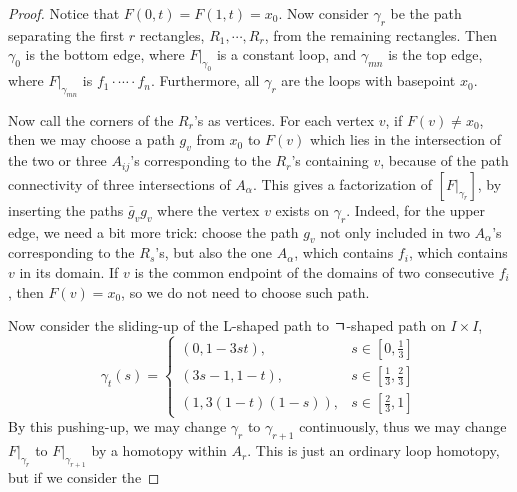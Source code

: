 \begin{proof}
Notice that $F(0,t)=F(1,t)=x_0$. Now consider $\gamma_r$ be the path separating the first $r$ rectangles, $R_1,\cdots,R_r$, from the remaining rectangles. Then $\gamma_0$ is the bottom edge, where $F|_{\gamma_0}$ is a constant loop, and $\gamma_{mn}$ is the top edge, where $F|_{\gamma_{mn}}$ is $f_1\cdot\cdots\cdot f_n$. Furthermore, all $\gamma_r$ are the loops with basepoint $x_0$.

Now call the corners of the $R_r$'s as vertices. For each vertex $v$, if $F(v)\neq x_0$, then we may choose a path $g_v$ from $x_0$ to $F(v)$ which lies in the intersection of the two or three $A_{ij}$'s corresponding to the $R_r$'s containing $v$, because of the path connectivity of three intersections of $A_\alpha$. This gives a factorization of $[F|_{\gamma_r}]$, by inserting the paths $\bar{g}_v g_v$ where the vertex $v$ exists on $\gamma_r$. Indeed, for the upper edge, we need a bit more trick: choose the path $g_v$ not only included in two $A_\alpha$'s corresponding to the $R_s$'s, but also the one $A_\alpha$, which contains $f_i$, which contains $v$ in its domain. If $v$ is the common endpoint of the domains of two consecutive $f_i$, then $F(v)=x_0$, so we do not need to choose such path.

Now consider the sliding-up of the L-shaped path to ㄱ-shaped path on $I\times I$,
\begin{equation}
\gamma_t(s)=\begin{cases}
(0,1-3st),&s\in [0,\frac{1}{3}]\\
(3s-1,1-t),&s\in [\frac{1}{3},\frac{2}{3}]\\
(1,3(1-t)(1-s)),&s\in [\frac{2}{3},1]
\end{cases}
\end{equation}
By this pushing-up, we may change $\gamma_r$ to $\gamma_{r+1}$ continuously, thus we may change $F|_{\gamma_r}$ to $F|_{\gamma_{r+1}}$ by a homotopy within $A_{r}$. This is just an ordinary loop homotopy, but if we consider the 


\end{proof}
